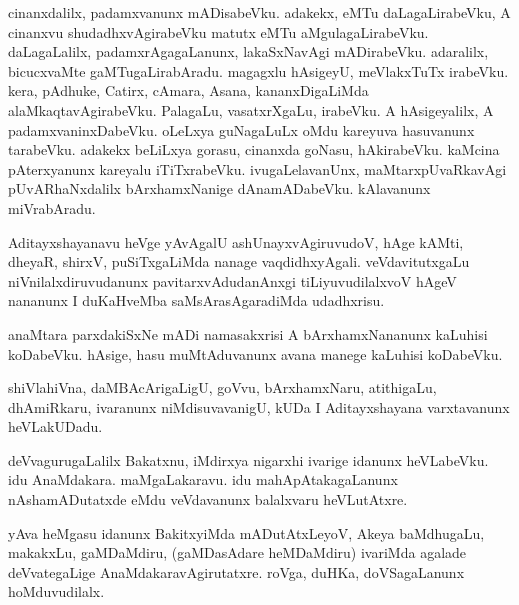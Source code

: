 \documentclass{article}
\begin{document}
\begin{mn}
cinanxdalilx,  padamxvanunx  mADisabeVku.  adakekx,  eMTu  daLagaLirabeVku,  A  cinanxvu  shudadhxvAgirabeVku  
matutx  eMTu  aMgulagaLirabeVku.  daLagaLalilx,  padamxrAgagaLanunx,  lakaSxNavAgi  mADirabeVku.  adaralilx,  
bicucxvaMte  gaMTugaLirabAradu.  magagxlu  hAsigeyU,  meVlakxTuTx  irabeVku.  kera,  pAdhuke,  Catirx,  cAmara,  
Asana,  kananxDigaLiMda  alaMkaqtavAgirabeVku.  PalagaLu,  vasatxrXgaLu,  irabeVku.  A  hAsigeyalilx,  A  
padamxvaninxDabeVku.  oLeLxya  guNagaLuLx  oMdu  kareyuva  hasuvanunx  tarabeVku.  adakekx  beLiLxya  gorasu,  
cinanxda  goNasu,  hAkirabeVku.  kaMcina  pAterxyanunx  kareyalu  iTiTxrabeVku.  ivugaLelavanUnx,  maMtarxpUvaRkavAgi  
pUvARhaNxdalilx  bArxhamxNanige  dAnamADabeVku.  kAlavanunx  miVrabAradu.  
\end{mn}

\begin{mn}
Aditayxshayanavu  heVge  yAvAgalU  ashUnayxvAgiruvudoV,  hAge  kAMti,  dheyaR,  shirxV,  puSiTxgaLiMda  
nanage  vaqdidhxyAgali.  veVdavitutxgaLu  niVnilalxdiruvudanunx  pavitarxvAdudanAnxgi  tiLiyuvudilalxvoV  
hAgeV  nananunx  I  duKaHveMba  saMsArasAgaradiMda  udadhxrisu.
\end{mn}

\begin{mn}
anaMtara  parxdakiSxNe  mADi  namasakxrisi  A  bArxhamxNananunx  kaLuhisi  koDabeVku.  hAsige,  hasu  
muMtAduvanunx  avana  manege  kaLuhisi  koDabeVku.
\end{mn}

\begin{mn}
shiVlahiVna,  daMBAcArigaLigU,  goVvu,  bArxhamxNaru,  atithigaLu,  dhAmiRkaru,  ivaranunx  
niMdisuvavanigU,  kUDa  I  Aditayxshayana  varxtavanunx  heVLakUDadu.
\end{mn}

\begin{mn}
deVvagurugaLalilx  Bakatxnu,  iMdirxya  nigarxhi ivarige  idanunx  heVLabeVku.  idu  AnaMdakara.  
maMgaLakaravu.  idu  mahApAtakagaLanunx  nAshamADutatxde  eMdu  veVdavanunx  balalxvaru  heVLutAtxre.
\end{mn}

\begin{mn}
yAva  heMgasu  idanunx  BakitxyiMda  mADutAtxLeyoV,  Akeya  baMdhugaLu,  makakxLu,  gaMDaMdiru,  
(gaMDasAdare  heMDaMdiru)  ivariMda  agalade  deVvategaLige  AnaMdakaravAgirutatxre.  roVga,  
duHKa,  doVSagaLanunx  hoMduvudilalx.
\end{mn}
\end{document}
